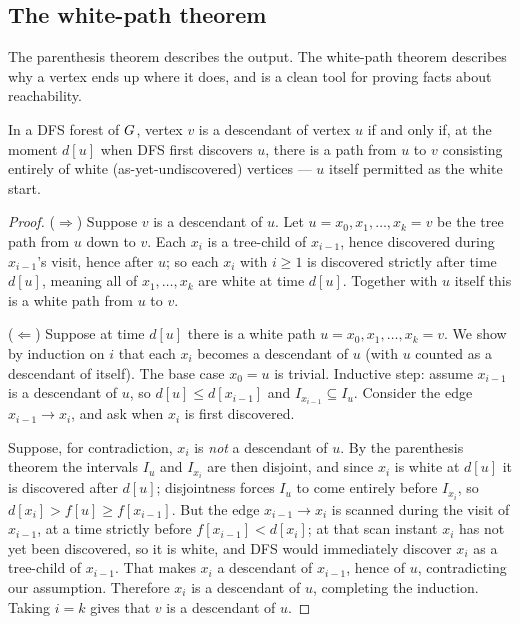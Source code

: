 \subsection{The white-path theorem}

The parenthesis theorem describes the output. The white-path theorem describes why a vertex ends up where it does, and is a clean tool for proving facts about reachability.

\begin{theorem}\label{ch03:thm-whitepath}
In a DFS forest of $G$, vertex $v$ is a descendant of vertex $u$ if and only if, at the moment $d[u]$ when DFS first discovers $u$, there is a path from $u$ to $v$ consisting entirely of white (as-yet-undiscovered) vertices --- $u$ itself permitted as the white start.
\end{theorem}

\begin{proof}
($\Rightarrow$) Suppose $v$ is a descendant of $u$. Let $u=x_0,x_1,\dots,x_k=v$ be the tree path from $u$ down to $v$. Each $x_{i}$ is a tree-child of $x_{i-1}$, hence discovered during $x_{i-1}$'s visit, hence after $u$; so each $x_i$ with $i\ge 1$ is discovered strictly after time $d[u]$, meaning all of $x_1,\dots,x_k$ are white at time $d[u]$. Together with $u$ itself this is a white path from $u$ to $v$.

($\Leftarrow$) Suppose at time $d[u]$ there is a white path $u=x_0,x_1,\dots,x_k=v$. We show by induction on $i$ that each $x_i$ becomes a descendant of $u$ (with $u$ counted as a descendant of itself). The base case $x_0=u$ is trivial. Inductive step: assume $x_{i-1}$ is a descendant of $u$, so $d[u]\le d[x_{i-1}]$ and $I_{x_{i-1}}\subseteq I_u$. Consider the edge $x_{i-1}\to x_i$, and ask when $x_i$ is first discovered.

Suppose, for contradiction, $x_i$ is \emph{not} a descendant of $u$. By the parenthesis theorem the intervals $I_u$ and $I_{x_i}$ are then disjoint, and since $x_i$ is white at $d[u]$ it is discovered after $d[u]$; disjointness forces $I_u$ to come entirely before $I_{x_i}$, so $d[x_i]>f[u]\ge f[x_{i-1}]$. But the edge $x_{i-1}\to x_i$ is scanned during the visit of $x_{i-1}$, at a time strictly before $f[x_{i-1}]<d[x_i]$; at that scan instant $x_i$ has not yet been discovered, so it is white, and DFS would immediately discover $x_i$ as a tree-child of $x_{i-1}$. That makes $x_i$ a descendant of $x_{i-1}$, hence of $u$, contradicting our assumption. Therefore $x_i$ is a descendant of $u$, completing the induction. Taking $i=k$ gives that $v$ is a descendant of $u$.
\end{proof}

